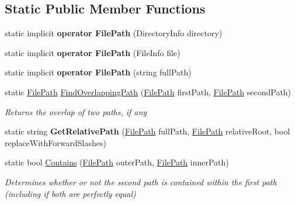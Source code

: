 \subsection*{Static Public Member Functions}
\begin{DoxyCompactItemize}
\item 
\hypertarget{class_cloud_api_public_1_1_model_1_1_file_path_a207de9e47985b6aebd7ff55402cad10c}{static implicit {\bfseries operator File\-Path} (Directory\-Info directory)}\label{class_cloud_api_public_1_1_model_1_1_file_path_a207de9e47985b6aebd7ff55402cad10c}

\item 
\hypertarget{class_cloud_api_public_1_1_model_1_1_file_path_a487405c44f1fdfb000153cff0b5fb82c}{static implicit {\bfseries operator File\-Path} (File\-Info file)}\label{class_cloud_api_public_1_1_model_1_1_file_path_a487405c44f1fdfb000153cff0b5fb82c}

\item 
\hypertarget{class_cloud_api_public_1_1_model_1_1_file_path_a02e6124740c2197434373db93c843932}{static implicit {\bfseries operator File\-Path} (string full\-Path)}\label{class_cloud_api_public_1_1_model_1_1_file_path_a02e6124740c2197434373db93c843932}

\item 
static \hyperlink{class_cloud_api_public_1_1_model_1_1_file_path}{File\-Path} \hyperlink{class_cloud_api_public_1_1_model_1_1_file_path_a546fa862491a9ac6f9f27fefcdcc8e70}{Find\-Overlapping\-Path} (\hyperlink{class_cloud_api_public_1_1_model_1_1_file_path}{File\-Path} first\-Path, \hyperlink{class_cloud_api_public_1_1_model_1_1_file_path}{File\-Path} second\-Path)
\begin{DoxyCompactList}\small\item\em Returns the overlap of two paths, if any \end{DoxyCompactList}\item 
\hypertarget{class_cloud_api_public_1_1_model_1_1_file_path_ae59cc87c9025226cd9c00578c4b7b453}{static string {\bfseries Get\-Relative\-Path} (\hyperlink{class_cloud_api_public_1_1_model_1_1_file_path}{File\-Path} full\-Path, \hyperlink{class_cloud_api_public_1_1_model_1_1_file_path}{File\-Path} relative\-Root, bool replace\-With\-Forward\-Slashes)}\label{class_cloud_api_public_1_1_model_1_1_file_path_ae59cc87c9025226cd9c00578c4b7b453}

\item 
static bool \hyperlink{class_cloud_api_public_1_1_model_1_1_file_path_ab3a9513bde83e7c917d385269d421bd4}{Contains} (\hyperlink{class_cloud_api_public_1_1_model_1_1_file_path}{File\-Path} outer\-Path, \hyperlink{class_cloud_api_public_1_1_model_1_1_file_path}{File\-Path} inner\-Path)
\begin{DoxyCompactList}\small\item\em Determines whether or not the second path is contained within the first path (including if both are perfectly equal) \end{DoxyCompactList}\end{DoxyCompactItemize}
